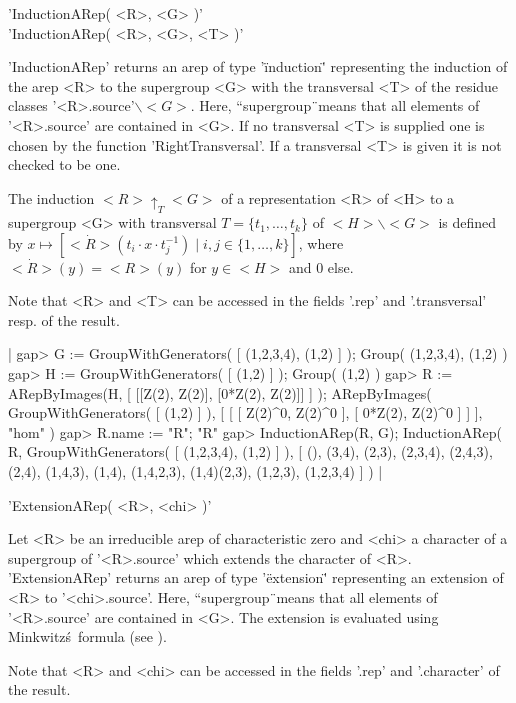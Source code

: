 
'InductionARep( <R>, <G> )'\\
'InductionARep( <R>, <G>, <T> )'

'InductionARep' returns an arep of type '\"induction\"' 
representing the induction of the arep <R> to 
the supergroup <G> with the transversal <T> of the residue classes
'<R>.source'$\backslash <G>$. Here, ``supergroup\"\ means 
that all elements of '<R>.source' are contained in <G>. If no
transversal <T> is supplied one is chosen by the function
'RightTransversal'. If a transversal <T> is given it is not checked
to be one.

The induction $<R>\uparrow_T <G>$ of a representation <R> of <H> to 
a supergroup <G> with transversal $T = \{t_1,\dots,t_k\}$ of 
$<H>\backslash <G>$ is defined by 
$x\mapsto\left[
\dot{<R>}\left(t_i\cdot x\cdot t_j^{-1}\right)
\mid i,j\in\{1,\dots,k\}\right]$, 
where $\dot{<R>}(y) = <R>(y)$ for $y\in <H>$ and 0 else.

Note that <R> and <T> can be accessed in the fields 
'.rep' and '.transversal' resp. of the result.

|    gap> G := GroupWithGenerators( [ (1,2,3,4), (1,2) ] );
    Group( (1,2,3,4), (1,2) )
    gap> H := GroupWithGenerators( [ (1,2) ] );
    Group( (1,2) )
    gap> R := ARepByImages(H, [ [[Z(2), Z(2)], [0*Z(2), Z(2)]] ] );
    ARepByImages(
      GroupWithGenerators( [ (1,2) ] ),
      [ [ [ Z(2)^0, Z(2)^0 ], [ 0*Z(2), Z(2)^0 ] ]
      ],
      "hom"
    )
    gap> R.name := "R";
    "R"
    gap> InductionARep(R, G);
    InductionARep(
      R,
      GroupWithGenerators( [ (1,2,3,4), (1,2) ] ),
      [ (), (3,4), (2,3), (2,3,4), (2,4,3), (2,4), (1,4,3), 
      (1,4), (1,4,2,3), (1,4)(2,3), (1,2,3), (1,2,3,4) ]
    ) |


'ExtensionARep( <R>, <chi> )'

Let <R> be an irreducible arep of characteristic zero and <chi> a 
character of a supergroup of '<R>.source' which extends the 
character of <R>. 'ExtensionARep' returns an arep of type 
'\"extension\"' representing an extension of <R> to 
'<chi>.source'. Here, ``supergroup\"\ means 
that all elements of '<R>.source' are contained in <G>.
The extension is evaluated using Minkwitz\'s\ formula 
(see \cite{Min96}).

Note that <R> and <chi> can be accessed in the fields 
'.rep' and '.character' of the result.

